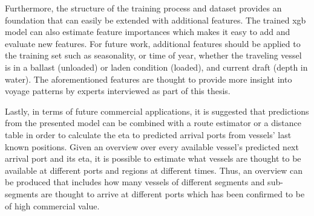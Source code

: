 Furthermore, the structure of the training process and dataset provides an foundation that can easily be extended with additional features. The trained \acrfull{xgb} model can also estimate feature importances which makes it easy to add and evaluate new features. For future work, additional features should be applied to the training set such as seasonality, or time of year, whether the traveling vessel is in a ballast (unloaded) or laden condition (loaded), and current draft (depth in water). The aforementioned features are thought to provide more insight into voyage patterns by experts interviewed as part of this thesis.

Lastly, in terms of future commercial applications, it is suggested that predictions from the presented model can be combined with a route estimator or a distance table in order to calculate the \acrfull{eta} to predicted arrival ports from vessels' last known positions. Given an overview over every available vessel's predicted next arrival port and its \acrshort{eta}, it is possible to estimate what vessels are thought to be available at different ports and regions at different times. Thus, an overview can be produced that includes how many vessels of different segments and sub-segments are thought to arrive at different ports which has been confirmed to be of high commercial value.
